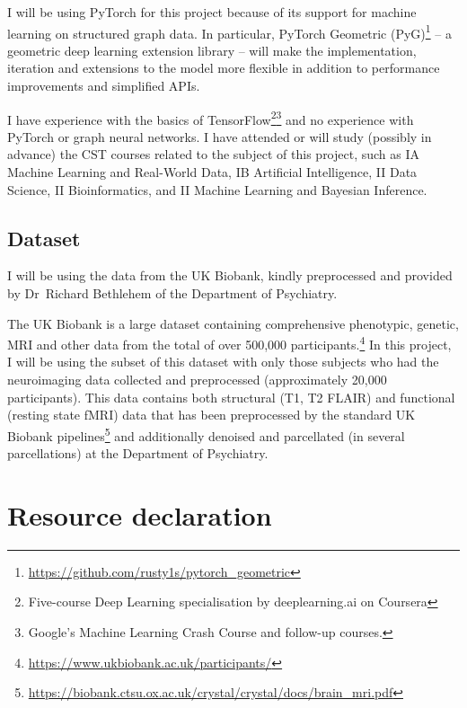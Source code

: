 \documentclass[12pt,a4paper,twoside]{article}
\begin{document}
I will be using PyTorch for this project because of its support for machine learning on structured graph data. In particular, PyTorch Geometric (PyG)\footnote{\url{https://github.com/rusty1s/pytorch_geometric}} – a geometric deep learning extension library – will make the implementation, iteration and extensions to the model more flexible in addition to performance improvements and simplified APIs.

I have experience with the basics of TensorFlow\footnote{Five-course Deep Learning specialisation by deeplearning.ai on Coursera}\footnote{Google's Machine Learning Crash Course and follow-up courses.} and no experience with PyTorch or graph neural networks. I have attended or will study (possibly in advance) the CST courses related to the subject of this project, such as IA Machine Learning and Real-World Data, IB Artificial Intelligence, II Data Science, II Bioinformatics, and II Machine Learning and Bayesian Inference.

\subsection*{Dataset}

I will be using the data from the UK Biobank, kindly preprocessed and provided by Dr~Richard Bethlehem of the Department of Psychiatry.

The UK Biobank is a large dataset containing comprehensive phenotypic, genetic, MRI and other data from the total of over 500,000 participants.\footnote{\url{https://www.ukbiobank.ac.uk/participants/}} In this project, I will be using the subset of this dataset with only those subjects who had the neuroimaging data collected and preprocessed (approximately 20,000 participants). This data contains both structural (T1, T2 FLAIR) and functional (resting state fMRI) data that has been preprocessed by the standard UK Biobank pipelines\footnote{\url{https://biobank.ctsu.ox.ac.uk/crystal/crystal/docs/brain_mri.pdf}} and additionally denoised and parcellated (in several parcellations) at the Department of Psychiatry. 

\section*{Resource declaration}
\end{document}
